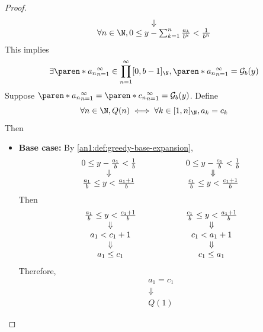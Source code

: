 \begin{proof}
\[\begin{array}{c}
      \Downarrow                                                                            \\
      \forall n \in \N, 0 \leq y - \sum_{k = 1}^{n} \frac{a_{k}}{b^{k}} < \frac{1}{b^{n}}
    \end{array}
  \]
  This implies
  \[
    \exists \paren*{a_{n}}_{n = 1}^{\infty} \in \prod_{n = 1}^{\infty} [0, b - 1]_{\N},
    \paren*{a_{n}}_{n = 1}^{\infty} = \mathcal{G}_{b}(y)
  \]
  Suppose $\paren*{a_{n}}_{n = 1}^{\infty} = \paren*{c_{n}}_{n = 1}^{\infty} = \mathcal{G}_{b}(y)$. Define
  \[
    \forall n \in \N, Q(n) \iff \forall k \in [1, n]_{\N}, a_{k} = c_{k}
  \]
  Then
  \begin{itemize}
    \item \textbf{Base case:} By \cref{an1:def:greedy-base-expansion},
          \[
            \begin{array}{c@{\qquad\qquad\qquad}c}
              0 \leq y - \frac{a_{1}}{b} < \frac{1}{b}     & 0 \leq y - \frac{c_{1}}{b} < \frac{1}{b}     \\
              \Downarrow                                   & \Downarrow                                   \\
              \frac{a_{1}}{b} \leq y < \frac{a_{1} + 1}{b} & \frac{c_{1}}{b} \leq y < \frac{c_{1} + 1}{b}
            \end{array}
          \]
          Then
          \[
            \begin{array}{c@{\qquad\qquad\qquad}c}
              \frac{a_{1}}{b} \leq y < \frac{c_{1} + 1}{b} & \frac{c_{1}}{b} \leq y < \frac{a_{1} + 1}{b} \\
              \Downarrow                                   & \Downarrow                                   \\
              a_{1} < c_{1} + 1                            & c_{1} < a_{1} + 1                            \\
              \Downarrow                                   & \Downarrow                                   \\
              a_{1} \leq c_{1}                             & c_{1} \leq a_{1}
            \end{array}
          \]
          Therefore,
          \[
            \begin{array}{c}
              a_{1} = c_{1} \\
              \Downarrow    \\
              Q(1)
            \end{array}
\]
\end{itemize}
\end{proof}
